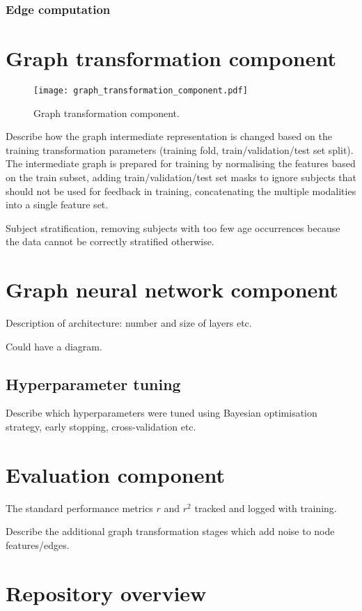 \subsubsection{Edge computation}



\section{Graph transformation component}

\begin{figure}[h]
    \centering
    \texttt{[image: graph\_transformation\_component.pdf]}
    \caption{Graph transformation component.}\label{graph-transformation-component}
\end{figure}

Describe how the graph intermediate representation is changed based on the training transformation parameters (training fold, train/validation/test set split). The intermediate graph is prepared for training by normalising the features based on the train subset, adding train/validation/test set masks to ignore subjects that should not be used for feedback in training, concatenating the multiple modalities into a single feature set.

Subject stratification, removing subjects with too few age occurrences because the data cannot be correctly stratified otherwise.


\section{Graph neural network component}
Description of architecture: number and size of layers etc.

Could have a diagram.

\subsection{Hyperparameter tuning}
Describe which hyperparameters were tuned using Bayesian optimisation strategy, early stopping, cross-validation etc.


\section{Evaluation component}
The standard performance metrics $r$ and $r^2$ tracked and logged with training.

Describe the additional graph transformation stages which add noise to node features/edges.


\section{Repository overview}

